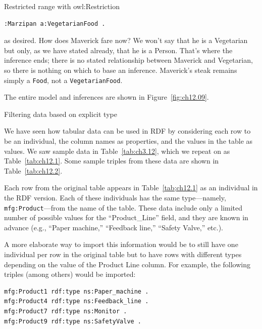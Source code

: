 \begin{challenge}{Restricted range with owl:Restriction}
\begin{lstlisting}
:Marzipan a:VegetarianFood .
\end{lstlisting}

as desired. How does Maverick fare now? We won't say that he is a
Vegetarian but only, as we have stated already, that he is a Person.
That's where the inference ends; there is no stated relationship between
Maverick and Vegetarian, so there is nothing on which to base an
inference. Maverick's steak remains simply a \texttt{Food}, not a \texttt{VegetarianFood}.

The entire model and inferences are shown in Figure~\ref{fig:ch12.09}.
\end{challenge}

\begin{challenge}{Filtering data based on explicit type}
\label{chal:27x}

We have seen how tabular data can be used in RDF by considering each row
to be an individual, the column names as properties, and the values in
the table as values. We saw sample data in Table~\ref{tab:ch3.12}, which we repeat
on  as Table~\ref{tab:ch12.1}. Some sample triples from these data are shown
in Table~\ref{tab:ch12.2}.

Each row from the original table appears in Table~\ref{tab;ch12.1} as an individual
in the RDF version. Each of these individuals has the same
type---namely, \texttt{mfg:Product}---from the name of the table. These data
include only a limited number of possible values for the
``Product\_Line'' field, and they are known in advance (e.g., ``Paper
machine,'' ``Feedback line,'' ``Safety Valve,'' etc.).

A more elaborate way to import this information would be to still have
one individual per row in the original table but to have rows with
different types depending on the value of the Product Line column. For
example, the following triples (among others) would be imported:

\begin{lstlisting}
mfg:Product1 rdf:type ns:Paper_machine .
mfg:Product4 rdf:type ns:Feedback_line .
mfg:Product7 rdf:type ns:Monitor .
mfg:Product9 rdf:type ns:SafetyValve .
\end{lstlisting}



\end{challenge}

